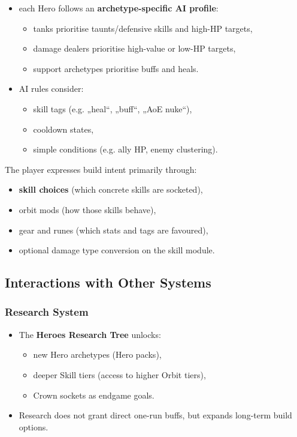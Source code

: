 \begin{itemize}
	\item each Hero follows an \textbf{archetype-specific AI profile}:
	\begin{itemize}
		\item tanks prioritise taunts/defensive skills and high-HP targets,
		\item damage dealers prioritise high-value or low-HP targets,
		\item support archetypes prioritise buffs and heals.
	\end{itemize}
	\item AI rules consider:
	\begin{itemize}
		\item skill tags (e.g. „heal“, „buff“, „AoE nuke“),
		\item cooldown states,
		\item simple conditions (e.g. ally HP, enemy clustering).
	\end{itemize}
\end{itemize}

The player expresses build intent primarily through:

\begin{itemize}
	\item \textbf{skill choices} (which concrete skills are socketed),
	\item orbit mods (how those skills behave),
	\item gear and runes (which stats and tags are favoured),
	\item optional damage type conversion on the skill module.
\end{itemize}


\subsection{Interactions with Other Systems}

\subsubsection*{Research System}

\begin{itemize}
	\item The \textbf{Heroes Research Tree} unlocks:
	\begin{itemize}
		\item new Hero archetypes (Hero packs),
		\item deeper Skill tiers (access to higher Orbit tiers),
		\item Crown sockets as endgame goals.
	\end{itemize}
	\item Research does not grant direct one-run buffs, but expands long-term build options.
\end{itemize}

